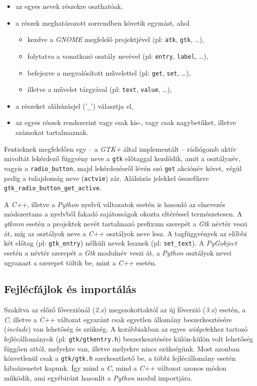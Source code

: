 \begin{itemize}
  \item az egyes nevek részekre oszthatóak,
  \item a részek meghatározott sorrendben követik egymást, ahol
  \begin{itemize}
    \item kezdve a \textit{GNOME} megfelelő projektjével (pl: \texttt{atk}, \texttt{gtk}, \dots),
    \item folytatva a vonatkozó osztály nevével (pl: \texttt{entry}, \texttt{label}, \dots),
    \item befejezve a megvalósított művelettel (pl: \texttt{get}, \texttt{set}, \dots),
    \item illetve a művelet tárgyával (pl: \texttt{text}, \texttt{value}, \dots),
  \end{itemize}
  \item a részeket aláhúzásjel ('\texttt{\_}') választja el,
  \item az egyes részek rendszerint vagy csak kis-, vagy csak nagybetűket, illetve számokat tartalmaznak.
\end{itemize}

Fentieknek megfelelően egy -- a \textit{GTK+} által implementált -- rádiógomb aktív mivoltát lekérdező függvény neve a \texttt{gtk} előtaggal kezdődik, amit a osztálynév, vagyis a \texttt{radio\_button}, majd lekérdezésről lévén szó \texttt{get} akciónév követ, végül pedig a tulajdonság neve (\texttt{actvie}) zár. Aláhúzás jelekkel összefűzve \texttt{gtk\_radio\_button\_get\_active}.

A \textit{C++}, illetve a \textit{Python} nyelvű változatok esetén is hasonló az elnevezés módszertana a nyelvből fakadó sajátosságok okozta eltéréssel természetesen. A \textit{gtkmm} esetén a projektek nevét tartalmazó prefixum szerepét a \textit{Gtk} névtér veszi át, míg az osztályok neve a \textit{C++} osztályok neve lesz. A tagfüggvények az előbbi két előtag (pl: \texttt{gtk\_entry}) nélküli nevek lesznek (pl: \texttt{set\_text}). A \textit{PyGobject} esetén a névtér szerepét a \textit{Gtk} modulnév veszi át, a \textit{Python} osztályok nevei ugyanazt a szerepet töltik be, mint a \textit{C++} esetén.

\subsection{Fejlécfájlok és importálás}

Szakítva az előző főverziónál (\textit{2.x}) megszokottaktól az új főverzió (\textit{3.x}) esetén, a \textit{C}, illetve a \textit{C++} változat egyaránt csak egyetlen állomány beszerkesztésére (\textit{include}) van lehetőség és szükség. A korábbiakban az egyes \textit{widget}ekhez tartozó fejlécállományok (pl: \texttt{gtk/gtkentry.h}) beszerkesztésére külön-külön volt lehetőség függően attól, melyekre van, illetve melyekre nincs szükségünk. Most azonban közvetlenül csak a \texttt{gtk/gtk.h} szerkeszthető be, a többi fejlécállomány esetén hibaüzenetet kapunk. Így mind a \textit{C}, mind a \textit{C++} változat azonos módon működik, ami egyébiránt hasonlít a \textit{Python} modul importjára.

